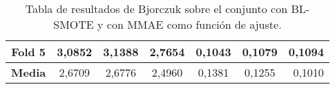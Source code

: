 \begin{table}[H]
{\begin{tabular}{|crrrrrr|}
\multicolumn{1}{|c|}{\textbf{Fold 5}} & \multicolumn{1}{c|}{3,0852}            & \multicolumn{1}{c|}{3,1388}              & \multicolumn{1}{c|}{2,7654}          & \multicolumn{1}{c|}{0,1043}            & \multicolumn{1}{c|}{0,1079}              & 0,1094                             \\ \hline
\multicolumn{1}{|c|}{\textbf{Media}}  & \multicolumn{1}{c|}{2,6709}            & \multicolumn{1}{c|}{2,6776}             & \multicolumn{1}{c|}{2,4960}         & \multicolumn{1}{c|}{0,1381}           & \multicolumn{1}{c|}{0,1255}             & 0,1010                            \\ \hline
\end{tabular}%
}
\caption{Tabla de resultados de Bjorczuk sobre el conjunto con BL-SMOTE y con MMAE como función de ajuste.}\label{tablaBJORCZUKconBLSMOTEconMMAE}

\end{table}


